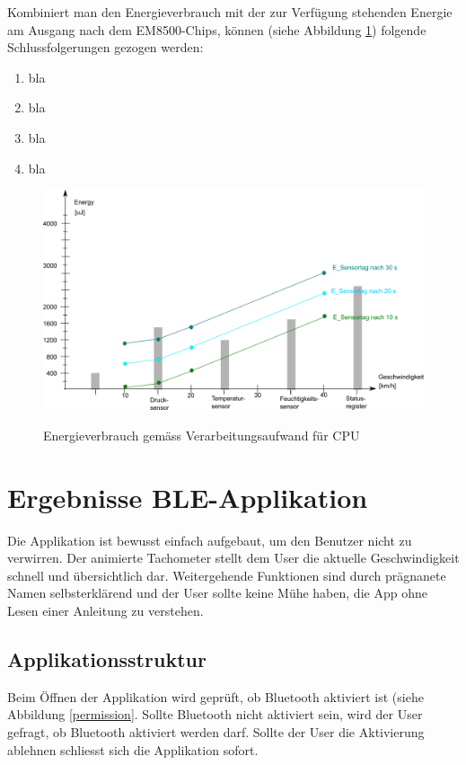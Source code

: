 Kombiniert man den Energieverbrauch mit der zur Verfügung stehenden Energie am Ausgang nach dem EM8500-Chips, können (siehe Abbildung \ref{resultat_Zsm_Energy}) folgende Schlussfolgerungen gezogen werden:

\begin{enumerate}
    \item bla
    \item bla
    \item bla
    \item bla
\end{enumerate}

\begin{figure}[ht]
\includegraphics[width=1\textwidth]{4Resultate/imag/EnergyVerbrauchZusammenfassung.png}\label{resultat_Zsm_Energy} 
\caption{Energieverbrauch gemäss Verarbeitungsaufwand für CPU}
\end{figure}


\section{Ergebnisse BLE-Applikation}

Die Applikation ist bewusst einfach aufgebaut, um den Benutzer nicht zu verwirren. Der animierte Tachometer stellt dem User die aktuelle Geschwindigkeit schnell und übersichtlich dar. Weitergehende Funktionen sind durch prägnanete Namen selbsterklärend und der User sollte keine Mühe haben, die App ohne Lesen einer Anleitung zu verstehen.

\subsection{Applikationsstruktur}

Beim Öffnen der Applikation wird geprüft, ob Bluetooth aktiviert ist (siehe Abbildung \ref{permission}. Sollte Bluetooth nicht aktiviert sein, wird der User gefragt, ob Bluetooth aktiviert werden darf. Sollte der User die Aktivierung ablehnen schliesst sich die Applikation sofort.


